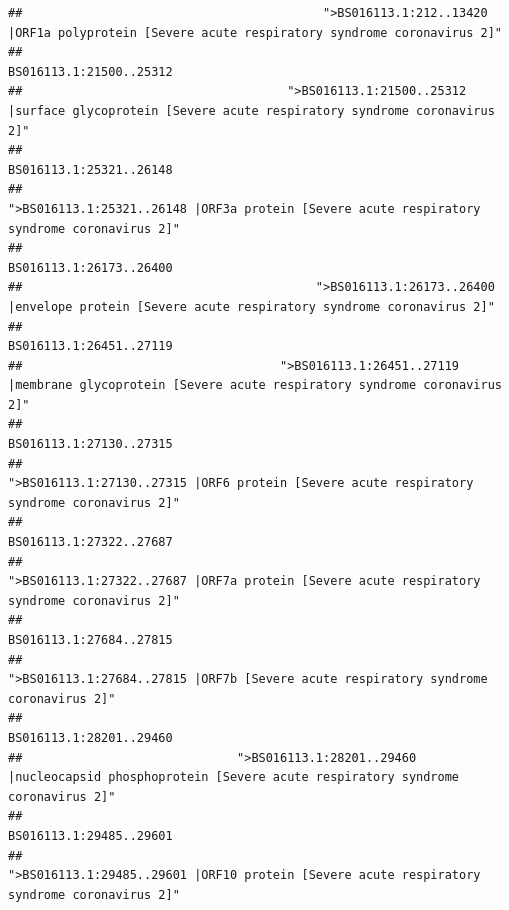 \documentclass[
]{article}
\begin{document}
\begin{verbatim}
##                                          ">BS016113.1:212..13420 |ORF1a polyprotein [Severe acute respiratory syndrome coronavirus 2]" 
##                                                                                                                BS016113.1:21500..25312 
##                                     ">BS016113.1:21500..25312 |surface glycoprotein [Severe acute respiratory syndrome coronavirus 2]" 
##                                                                                                                BS016113.1:25321..26148 
##                                            ">BS016113.1:25321..26148 |ORF3a protein [Severe acute respiratory syndrome coronavirus 2]" 
##                                                                                                                BS016113.1:26173..26400 
##                                         ">BS016113.1:26173..26400 |envelope protein [Severe acute respiratory syndrome coronavirus 2]" 
##                                                                                                                BS016113.1:26451..27119 
##                                    ">BS016113.1:26451..27119 |membrane glycoprotein [Severe acute respiratory syndrome coronavirus 2]" 
##                                                                                                                BS016113.1:27130..27315 
##                                             ">BS016113.1:27130..27315 |ORF6 protein [Severe acute respiratory syndrome coronavirus 2]" 
##                                                                                                                BS016113.1:27322..27687 
##                                            ">BS016113.1:27322..27687 |ORF7a protein [Severe acute respiratory syndrome coronavirus 2]" 
##                                                                                                                BS016113.1:27684..27815 
##                                                    ">BS016113.1:27684..27815 |ORF7b [Severe acute respiratory syndrome coronavirus 2]" 
##                                                                                                                BS016113.1:28201..29460 
##                              ">BS016113.1:28201..29460 |nucleocapsid phosphoprotein [Severe acute respiratory syndrome coronavirus 2]" 
##                                                                                                                BS016113.1:29485..29601 
##                                            ">BS016113.1:29485..29601 |ORF10 protein [Severe acute respiratory syndrome coronavirus 2]" 

\end{verbatim}
\end{document}
